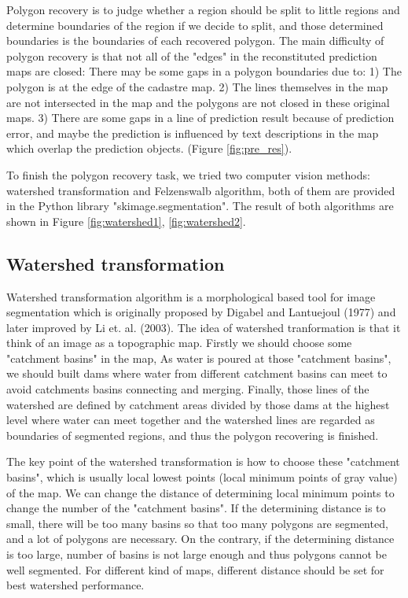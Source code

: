 \documentclass[12pt]{article}
\begin{document}
Polygon recovery is to judge whether a region should be split to little regions and determine boundaries of the region if we decide to split, and those determined boundaries is the boundaries of each recovered polygon. The main difficulty of polygon recovery is that not all of the "edges" in the reconstituted prediction maps are closed: There may be some gaps in a polygon boundaries due to: 1) The polygon is at the edge of the cadastre map. 2) The lines themselves in the map are not intersected in the map and the polygons are not closed in these original maps. 3) There are some gaps in a line of prediction result because of prediction error, and maybe the prediction is influenced by text descriptions in the map which overlap the prediction objects. (Figure \ref{fig:pre_res}). 

To finish the polygon recovery task, we tried two computer vision methods: watershed transformation and Felzenswalb algorithm, both of them are provided in the Python library "skimage.segmentation"\cite{van2014scikit}. The result of both algorithms are shown in Figure \ref{fig:watershed1}, \ref{fig:watershed2}.

\subsection{Watershed transformation}

Watershed transformation algorithm is a morphological based tool for image segmentation which is originally proposed by Digabel and Lantuejoul (1977) and later improved by Li et. al. (2003)\cite{khiyal2009modified, li2003improved}. The idea of watershed tranformation is that it think of an image as a topographic map. Firstly we should choose some "catchment basins" in the map,  As water is poured at those "catchment basins", we should built dams where water from different catchment basins can meet to avoid catchments basins connecting and merging. Finally, those lines of the watershed are defined by catchment areas divided by those dams at the highest level where water can meet together and the watershed lines are regarded as boundaries of segmented regions, and thus the polygon recovering is finished.

The key point of the watershed transformation is how to choose these "catchment basins", which is usually local lowest points (local minimum points of gray value) of the map. We can change the distance of determining local minimum points to change the number of the "catchment basins". If the determining distance is to small, there will be too many basins so that too many polygons are segmented, and a lot of polygons are necessary. On the contrary, if the determining distance is too large, number of basins is not large enough and thus polygons cannot be well segmented. For different kind of maps, different distance should be set for best watershed performance.  
\end{document}
